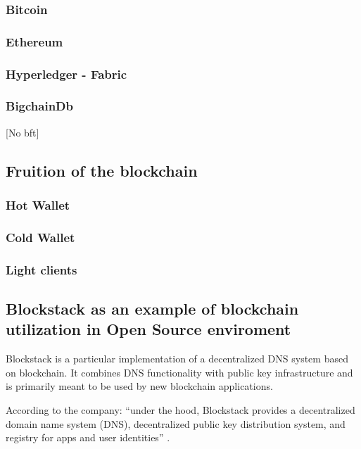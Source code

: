 \subsubsection{Bitcoin}

\subsubsection{Ethereum}

\subsubsection{Hyperledger - Fabric}

\subsubsection{BigchainDb}
[No bft]



\subsection{Fruition of the blockchain}

\subsubsection{Hot Wallet}
\subsubsection{Cold Wallet}

\subsubsection{Light clients}

\subsection{Blockstack as an example of blockchain utilization in Open Source enviroment}
Blockstack is a particular implementation of a decentralized DNS system based on blockchain. It combines DNS functionality with public key infrastructure and is primarily meant to be used by new blockchain applications.

According to the company: \enquote{under the hood, Blockstack provides a decentralized domain name system (DNS), decentralized public key distribution system, and registry for apps and user identities} \cite{BlockStackMainPage}.

